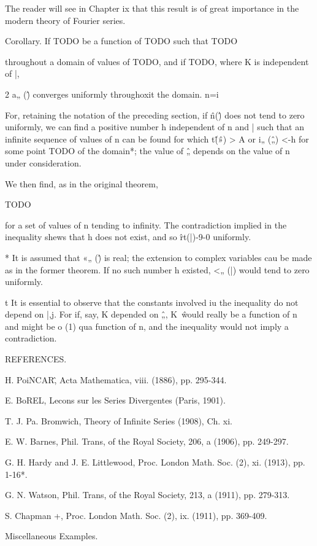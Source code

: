 The reader will see in Chapter ix that this result is of great
importance in the modern theory of Fourier series.

Corollary. If TODO be a function of TODO such that TODO

throughout a domain of values of TODO, and if TODO, where K is
independent of |,

2 a„ (\^) converges uniformly throughoxit the domain. n=i

For, retaining the notation of the preceding section, if \^n(\^) does
not tend to zero uniformly, we can find a positive number h
independent of n and | such that an infinite sequence of values of n
can be found for which t\^ (\^») > A or i„ (\^„) <-h for some point
TODO of the domain*; the value of \^„ depends on the value of n under
consideration.

We then find, as in the original theorem,

TODO

for a set of values of n tending to infinity. The contradiction
implied in the inequality shews that h does not exist, and so
\^rt(|)-9-0 uniformly.

* It is assumed that «„ (\^) is real; the extension to complex
variables cau be made as in the former theorem. If no such number h
existed, <„ (|) would tend to zero uniformly.

t It is essential to observe that the constants involved iu the
inequality do not depend on |,j. For if, say, K depended on \^„, K~\^
would really be a function of n and might be o (1) qua function of n,
and the inequality would not imply a contradiction.

%
%

REFERENCES.

H. PoiNCAR\^, Acta Mathematica, viii. (1886), pp. 295-344.

E. BoREL, Lecons sur les Series Divergentes (Paris, 1901).

T. J. Pa. Bromwich, Theory of Infinite Series (1908), Ch. xi.

E. W. Barnes, Phil. Trans, of the Royal Society, 206, a (1906), pp.
249-297.

G. H. Hardy and J. E. Littlewood, Proc. London Math. Soc. (2), xi.
(1913), pp. 1-16*.

G. N. Watson, Phil. Trans, of the Royal Society, 213, a (1911), pp.
279-313.

S. Chapman +, Proc. London Math. Soc. (2), ix. (1911), pp. 369-409.

Miscellaneous Examples.

